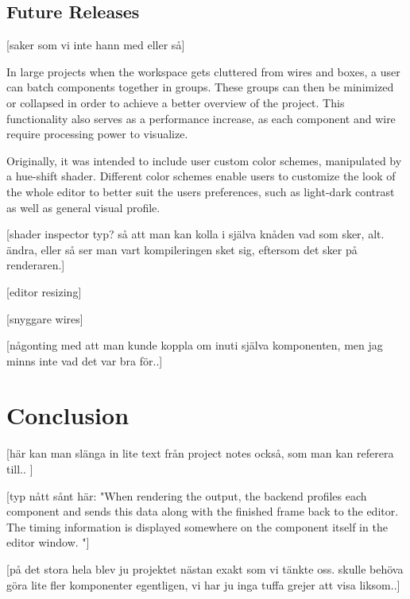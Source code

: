 

\section{Future Releases}
[saker som vi inte hann med eller så]

In large projects when the workspace gets cluttered from wires and boxes, a user can batch components together in groups. These groups can then be minimized or collapsed in order to achieve a better overview of the project. This functionality also serves as a performance increase, as each component and wire require processing power to visualize. 

Originally, it was intended to include user custom color schemes, manipulated by a hue-shift shader. Different color schemes enable users to customize the look of the whole editor to better suit the users preferences, such as light-dark contrast as well as general visual profile.

[shader inspector typ? så att man kan kolla i själva knåden vad som sker, alt. ändra, eller så ser man vart kompileringen sket sig, eftersom det sker på renderaren.]

[editor resizing]

[snyggare wires]

[någonting med att man kunde koppla om inuti själva komponenten, men jag minns inte vad det var bra för..]

\chapter{Conclusion}

[här kan man slänga in lite text från project notes också, som man kan referera till.. ]

[typ nått sånt här: "When rendering the output, the backend profiles each component and sends this data along with the finished frame back to the editor. The timing information is displayed somewhere on the component itself in the editor window. "]

[på det stora hela blev ju projektet nästan exakt som vi tänkte oss. skulle behöva göra lite fler komponenter egentligen, vi har ju inga tuffa grejer att visa liksom..]